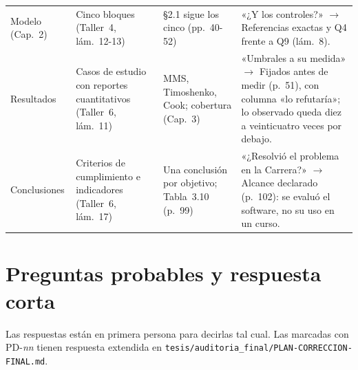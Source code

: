 \documentclass[11pt,a4paper]{article}
\begin{document}
{\begin{longtable}{@{}L{2.1cm}L{3.4cm}L{3.7cm}L{6.1cm}@{}}
Modelo (Cap.~2) & Cinco bloques (Taller~4, lám.~12-13) & §2.1 sigue los cinco (pp.~40-52) & «¿Y los controles?» $\to$ Referencias exactas y Q4 frente a Q9 (lám.~8).\\
Resultados & Casos de estudio con reportes cuantitativos (Taller~6, lám.~11) & MMS, Timoshenko, Cook; cobertura (Cap.~3) & «Umbrales a su medida» $\to$ Fijados antes de medir (p.~51), con columna «lo refutaría»; lo observado queda diez a veinticuatro veces por debajo.\\
Conclusiones & Criterios de cumplimiento e indicadores (Taller~6, lám.~17) & Una conclusión por objetivo; Tabla~3.10 (p.~99) & «¿Resolvió el problema en la Carrera?» $\to$ Alcance declarado (p.~102): se evaluó el software, no su uso en un curso.\\
\end{longtable}}

\section{Preguntas probables y respuesta corta}\label{sec:preguntas}

Las respuestas están en primera persona para decirlas tal cual. Las marcadas con PD-\emph{nn} tienen respuesta extendida en \texttt{tesis/auditoria\_final/PLAN-CORRECCION-FINAL.md}.
\end{document}
